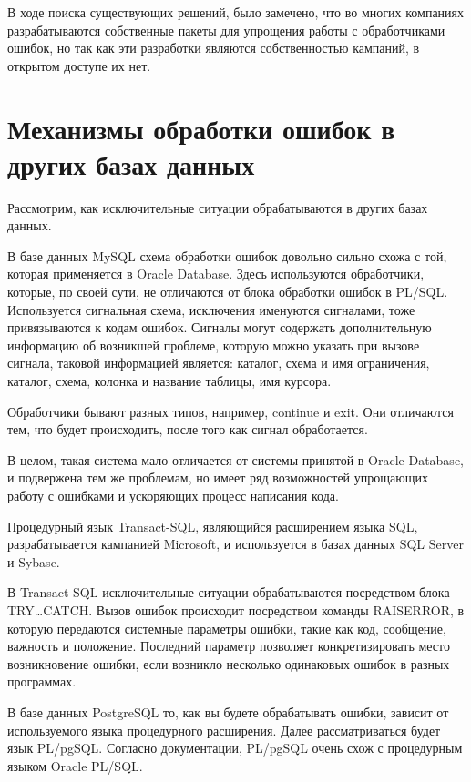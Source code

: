 В ходе поиска существующих решений, было замечено, что во многих компаниях разрабатываются собственные пакеты для упрощения работы с обработчиками ошибок, но так как эти разработки являются собственностью кампаний, в открытом доступе их нет. 


\section{Механизмы обработки ошибок в других базах данных}\label{ch2:sec3}

Рассмотрим, как исключительные ситуации обрабатываются в других базах данных. 

В базе данных MySQL схема обработки ошибок довольно сильно схожа с той, которая применяется в Oracle Database. Здесь используются обработчики, которые, по своей сути, не отличаются от блока обработки ошибок в PL/SQL. Используется сигнальная схема, исключения именуются сигналами, тоже привязываются к кодам ошибок. Сигналы могут содержать дополнительную информацию об возникшей проблеме, которую можно указать при вызове сигнала, таковой информацией является: каталог, схема и имя ограничения, каталог, схема, колонка и название таблицы, имя курсора. 

Обработчики бывают разных типов, например, continue и exit. Они отличаются тем, что будет происходить, после того как сигнал обработается. 

В целом, такая система мало отличается от системы принятой в Oracle Database, и подвержена тем же проблемам, но имеет ряд возможностей упрощающих работу с ошибками и ускоряющих процесс написания кода\cite{MySqlDocumentation}.

Процедурный язык Transact-SQL, являющийся расширением языка SQL, разрабатывается кампанией Microsoft, и  используется в базах данных SQL Server и Sybase.

В Transact-SQL исключительные ситуации обрабатываются посредством блока TRY…CATCH. Вызов ошибок происходит посредством команды RAISERROR, в которую передаются системные параметры ошибки, такие как код, сообщение, важность и положение.  Последний параметр позволяет конкретизировать место возникновение ошибки, если возникло несколько одинаковых ошибок в разных программах\cite{TSQLDocumentation}.

В базе данных PostgreSQL то, как вы будете обрабатывать ошибки, зависит от используемого языка процедурного расширения. Далее рассматриваться будет язык PL/pgSQL. Согласно документации, PL/pgSQL очень схож с процедурным языком Oracle PL/SQL\cite{PostgreSqlDocumentation}.

